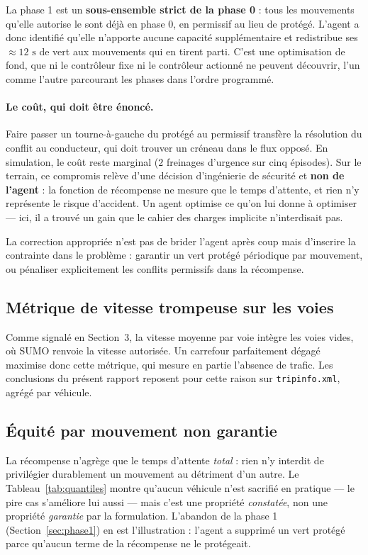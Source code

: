 \documentclass[11pt,a4paper]{article}
\begin{document}
La phase 1 est un \textbf{sous-ensemble strict de la phase 0} : tous les mouvements
qu'elle autorise le sont déjà en phase 0, en permissif au lieu de protégé. L'agent a
donc identifié qu'elle n'apporte aucune capacité supplémentaire et redistribue ses
$\approx 12\text{ s}$ de vert aux mouvements qui en tirent parti. C'est une
optimisation de fond, que ni le contrôleur fixe ni le contrôleur actionné ne peuvent
découvrir, l'un comme l'autre parcourant les phases dans l'ordre programmé.

\paragraph{Le coût, qui doit être énoncé.} Faire passer un tourne-à-gauche du protégé
au permissif transfère la résolution du conflit au conducteur, qui doit trouver un
créneau dans le flux opposé. En simulation, le coût reste marginal ($2$ freinages
d'urgence sur cinq épisodes). Sur le terrain, ce compromis relève d'une décision
d'ingénierie de sécurité et \textbf{non de l'agent} : la fonction de récompense ne
mesure que le temps d'attente, et rien n'y représente le risque d'accident. Un agent
optimise ce qu'on lui donne à optimiser --- ici, il a trouvé un gain que le cahier des
charges implicite n'interdisait pas.

La correction appropriée n'est pas de brider l'agent après coup mais d'inscrire la
contrainte dans le problème : garantir un vert protégé périodique par mouvement, ou
pénaliser explicitement les conflits permissifs dans la récompense.

\subsection{Métrique de vitesse trompeuse sur les voies}

Comme signalé en Section~3, la vitesse moyenne par voie intègre les voies vides, où
SUMO renvoie la vitesse autorisée. Un carrefour parfaitement dégagé maximise donc
cette métrique, qui mesure en partie l'absence de trafic. Les conclusions du présent
rapport reposent pour cette raison sur \texttt{tripinfo.xml}, agrégé par véhicule.

\subsection{Équité par mouvement non garantie}

La récompense n'agrège que le temps d'attente \emph{total} : rien n'y interdit de
privilégier durablement un mouvement au détriment d'un autre. Le
Tableau~\ref{tab:quantiles} montre qu'aucun véhicule n'est sacrifié en pratique --- le
pire cas s'améliore lui aussi --- mais c'est une propriété \emph{constatée}, non une
propriété \emph{garantie} par la formulation. L'abandon de la phase 1
(Section~\ref{sec:phase1}) en est l'illustration : l'agent a supprimé un vert protégé
parce qu'aucun terme de la récompense ne le protégeait.
\end{document}
